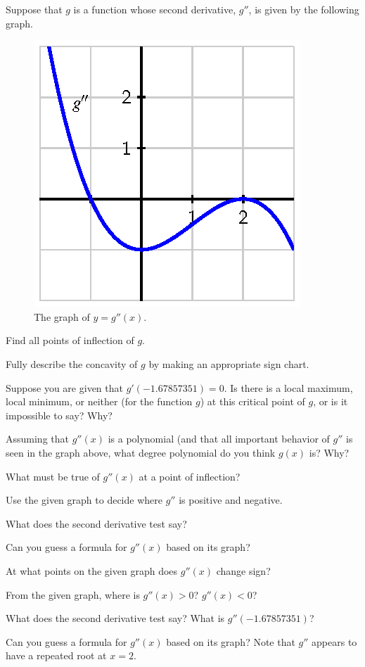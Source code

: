 \begin{activity} \label{A:3.1.2}  Suppose that $g$ is a function whose second derivative, $g''$, is given by the following graph.
\begin{figure}[h]
\hfil
\includegraphics{figures/3_1_Act2.eps} 
\hfil
\caption{The graph of $y = g''(x)$.} \label{F:3.1.Act2}
\end{figure}
\ba 
  \item Find all points of inflection of $g$. 
  \item Fully describe the concavity of $g$ by making an appropriate sign chart.  
  \item Suppose you are given that $g'(-1.67857351) = 0$.  Is there is a local maximum, local minimum, or neither (for the function $g$) at this critical point of $g$, or is it impossible to say?  Why?
  \item Assuming that $g''(x)$ is a polynomial (and that all important behavior of $g''$ is seen in the graph above, what degree polynomial do you think $g(x)$ is?  Why?
\ea
\end{activity}
\begin{smallhint}
\ba 
  \item What must be true of $g''(x)$ at a point of inflection?
  \item Use the given graph to decide where $g''$ is positive and negative.
  \item What does the second derivative test say?
  \item Can you guess a formula for $g''(x)$ based on its graph?
\ea
\end{smallhint}
\begin{bighint}
\ba 
  \item At what points on the given graph does $g''(x)$ change sign?
  \item From the given graph, where is $g''(x) > 0$?  $g''(x) < 0$?
  \item What does the second derivative test say?  What is $g''(-1.67857351)$?
  \item Can you guess a formula for $g''(x)$ based on its graph?  Note that $g''$ appears to have a repeated root at $x = 2$.
\ea
\end{bighint}
